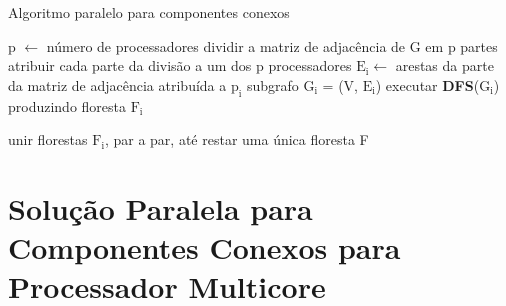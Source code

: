 \documentclass[12pt]{article}
\begin{document}
\begin{algorithm}[htp!]
    \DontPrintSemicolon
    \newcommand\mycommfont[1]{\small\ttfamily{#1}}
    \caption{Algoritmo paralelo para componentes conexos}
    \label{alg_grama}
    {
        p $\gets$ número de processadores\;
        dividir a matriz de adjacência de G em p partes\;
        atribuir cada parte da divisão a um dos p processadores\;
        {
            $\text{E}_\text{i} \gets$ arestas da parte da matriz de adjacência atribuída a $\text{p}_\text{i}$\;
            subgrafo $\text{G}_\text{i}$ = (V, $\text{E}_\text{i}$)\;
            executar \textbf{DFS}($\text{G}_\text{i}$) produzindo floresta $\text{F}_\text{i}$\;
        }

        unir florestas $\text{F}_\text{i}$, par a par, até restar uma única floresta F\;
        
    }
\end{algorithm}

\section{Solução Paralela para Componentes Conexos para Processador Multicore}
\end{document}
